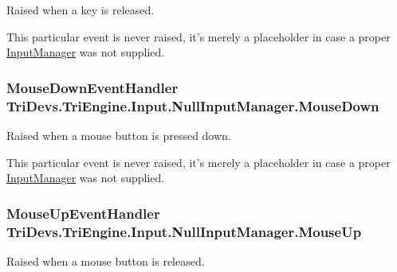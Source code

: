 Raised when a key is released. 

This particular event is never raised, it's merely a placeholder in case a proper \hyperlink{class_tri_devs_1_1_tri_engine_1_1_input_1_1_input_manager}{Input\-Manager} was not supplied. \hypertarget{class_tri_devs_1_1_tri_engine_1_1_input_1_1_null_input_manager_ae399201f4b9bee1eacbf5603b5bdd9f9}{
\subsubsection[{Mouse\-Down}]{\setlength{\rightskip}{0pt plus 5cm}Mouse\-Down\-Event\-Handler Tri\-Devs.\-Tri\-Engine.\-Input.\-Null\-Input\-Manager.\-Mouse\-Down}}\label{class_tri_devs_1_1_tri_engine_1_1_input_1_1_null_input_manager_ae399201f4b9bee1eacbf5603b5bdd9f9}


Raised when a mouse button is pressed down. 

This particular event is never raised, it's merely a placeholder in case a proper \hyperlink{class_tri_devs_1_1_tri_engine_1_1_input_1_1_input_manager}{Input\-Manager} was not supplied. \hypertarget{class_tri_devs_1_1_tri_engine_1_1_input_1_1_null_input_manager_a434dec2217196536881ae55ecf8f9e68}{
\subsubsection[{Mouse\-Up}]{\setlength{\rightskip}{0pt plus 5cm}Mouse\-Up\-Event\-Handler Tri\-Devs.\-Tri\-Engine.\-Input.\-Null\-Input\-Manager.\-Mouse\-Up}}\label{class_tri_devs_1_1_tri_engine_1_1_input_1_1_null_input_manager_a434dec2217196536881ae55ecf8f9e68}


Raised when a mouse button is released. 

